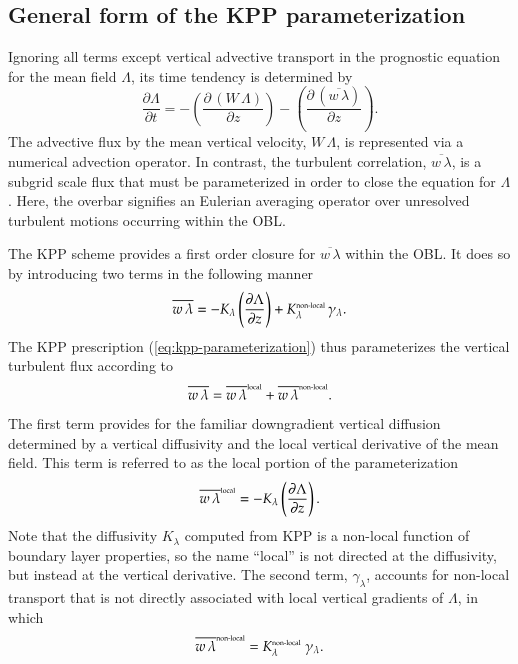  
\subsection{General form of the KPP parameterization}

Ignoring all terms except vertical advective transport in the
prognostic equation for the mean field $\Lambda$, its time tendency 
is determined by 
\begin{equation}
 \frac{\partial \Lambda}{\partial t} = -\left( \frac{\partial \, (W \, \Lambda)}{\partial z} \right)  
 -\left( \frac{\partial \, (\overline{w \, \lambda}) }{\partial z} \right).  
\label{eq:mean-field-equation-kpp}
\end{equation}
The advective flux by the mean vertical velocity, $W \, \Lambda$, is
represented via a numerical advection operator. In contrast, the
turbulent correlation, $\overline{w \, \lambda}$, is a subgrid scale
flux that must be parameterized in order to close the equation for
$\Lambda$. Here, the overbar signifies an Eulerian averaging operator
over unresolved turbulent motions occurring within the OBL.

The KPP scheme provides a first order closure for $\overline{w \,
  \lambda}$ within the OBL. It does so by introducing two terms in the
following manner 
\begin{equation}
  \overline{w \, \lambda} = -K_{\lambda} \left( \frac{\partial \Lambda}{\partial z}  \right)
   +  K^{\mbox{\tiny non-local}}_{\lambda}  \, \gamma_{\lambda}.
\label{eq:kpp-parameterization}
\end{equation}
The KPP prescription (\ref{eq:kpp-parameterization}) thus
parameterizes the vertical turbulent flux according to
\begin{equation}
  \overline{w \, \lambda} = \overline{w \, \lambda}^{\mbox{\tiny local}} + \overline{w \, \lambda}^{\mbox{\tiny non-local}}.
\label{eq:vertical-flux-decomposed}
\end{equation}
The first term provides for the familiar downgradient vertical
diffusion determined by a vertical diffusivity and the local vertical
derivative of the mean field.  This term is referred to as the local
portion of the parameterization
\begin{equation}
\overline{w \, \lambda}^{\mbox{\tiny local}} = -K_{\lambda}  \left( \frac{\partial \Lambda}{\partial z} \right).
\label{eq:vertical-flux-local}
\end{equation}
Note that the diffusivity $K_{\lambda} $ computed from KPP is a
non-local function of boundary layer properties, so the name ``local''
is not directed at the diffusivity, but instead at the vertical
derivative.  The second term, $\gamma_{\lambda}$, accounts for
non-local transport that is not directly associated with local
vertical gradients of $\Lambda$, in which
\begin{equation}
  \overline{w \, \lambda}^{\mbox{\tiny non-local}} = K^{\mbox{\tiny non-local}}_{\lambda} \; \gamma_{\lambda}.
\label{eq:vertical-flux-nonlocal}
\end{equation}



